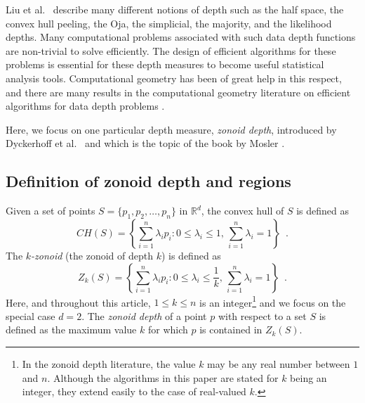 \documentclass{elsart}
\begin{document}
Liu et al.\ \cite{multivariate_analysis_by_data_depth} describe many
different notions of depth such as the half space, the convex hull
peeling, the Oja, the simplicial, the majority, and the likelihood
depths. Many computational problems associated with such data depth
functions are non-trivial to solve efficiently.  The design of
efficient algorithms for these problems is essential for these depth
measures to become useful statistical analysis tools.  Computational
geometry \cite{preparata_book} has been of great help in this respect,
and there are many results in the computational geometry literature
on efficient algorithms for data depth problems
\cite{regression_depth_and_center_points, aloupis_mcs_thesis,
algorithms_for_bivariate_medians_and_a_fermat_torricelli_problem_for_lines,
an_optimized_randomized_algorithm_for_maximum_tukey_depth,
on_khulls_and_related_problems,
zonoid_data_depth_theory_and_computation,
computing_the_centerpoint_of_a_finite_planar_set_of_points_in_linear_time,
on_a_triangle_counting_problem, langerman_phd_thesis,
the_complexity_of_hyperplane_depth_in_the_plane,
optimization_in_arrangements,
computing_the_center_of_planar_point_sets,
fast_implementation_of_depth_contours_using_topological_sweep,
statistical_algorithms_the_oja_bivariate_median,
efficient_algorithms_for_maximum_regression_depth,
a_lower_bound_for_computing_oja_depth,
on_the_computation_of_the_bivariate_median_and_a_fermat_torricelli_problem,
on_the_convex_layers_of_a_planar_set,
on_algorithms_for_simplicial_depth,
constructing_the_bivariate_tukey_median,
geometry_and_statistics_problems_at_the_interface,
some_new_algorithms_and_software_implementation_methods_for_pattern_recognition_research}.

Here, we focus on one particular depth measure, \emph{zonoid depth},
introduced by Dyckerhoff et al.\
\cite{zonoid_data_depth_theory_and_computation} and which is the topic
of the book by Mosler \cite{mosler_book}.

\subsection{Definition of zonoid depth and regions}
\label{subsection_definition_of_zonoid_depth_and_regions}

Given a set of points $S = \{p_1, p_2,\ldots, p_n\}$ in
$\mathbb{R}^d$, the convex hull of $S$ is defined as 
\[
   CH(S) = \left\{\sum_{i=1}^{n} \lambda_ip_i : 0 \le \lambda_i \le 1,\,
             \sum_{i=1}^{n}{\lambda_i} = 1\right\} \enspace . 
\] 
The \emph{$k$-zonoid} (the zonoid of depth $k$) is defined as
\[
   Z_k(S) = \left\{\sum_{i=1}^{n}\lambda_ip_i : 0 \le \lambda_i \le
             \frac{1}{k},\, \sum_{i=1}^{n}{\lambda_i} = 1\right\}
	\enspace .
\] 
Here, and throughout this article, $1 \le k \le n$ is an
integer\footnote{In the zonoid depth literature, the value $k$ may be
any real number between $1$ and $n$. Although the algorithms in this
paper are stated for $k$ being an integer, they extend easily to the
case of real-valued $k$.} and we focus on the special case $d=2$. The
\emph{zonoid depth} of a point $p$ with respect to a set $S$ is
defined as the maximum value $k$ for which $p$ is contained in
$Z_k(S)$.  
\end{document}
